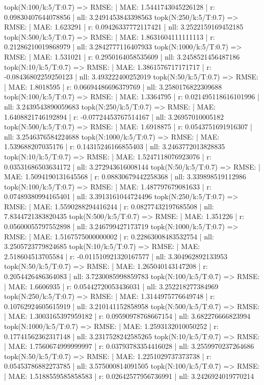 topk(N:100/k:5/T:0.7) => RMSE: | MAE: 1.5441743045226128 | r: 0.09830407644078856 | nll: 3.2491453843398563
topk(N:250/k:5/T:0.7) => RMSE: | MAE: 1.623291 | r: 0.09426337772117421 | nll: 3.2522159169452185
topk(N:500/k:5/T:0.7) => RMSE: | MAE: 1.8631604111111113 | r: 0.21286210019868979 | nll: 3.2842777116407933
topk(N:1000/k:5/T:0.7) => RMSE: | MAE: 1.531021 | r: 0.2950164058535609 | nll: 3.2458521456487186
topk(N:10/k:5/T:0.7) => RMSE: | MAE: 1.3861576717171717 | r: -0.08436802259250123 | nll: 3.493222400252019
topk(N:50/k:5/T:0.7) => RMSE: | MAE: 1.8018595 | r: 0.06694486696379769 | nll: 3.2580176822309688
topk(N:100/k:5/T:0.7) => RMSE: | MAE: 1.3364795 | r: 0.021495118616101996 | nll: 3.2439543890059683
topk(N:250/k:5/T:0.7) => RMSE: | MAE: 1.6408821746192894 | r: -0.07724453767514167 | nll: 3.26957010005182
topk(N:500/k:5/T:0.7) => RMSE: | MAE: 1.6918875 | r: 0.0543751691916307 | nll: 3.2546376584224688
topk(N:1000/k:5/T:0.7) => RMSE: | MAE: 1.539688207035176 | r: 0.14315246166855403 | nll: 3.2463772013828835
topk(N:10/k:5/T:0.7) => RMSE: | MAE: 1.5247118076923076 | r: 0.03531686503634172 | nll: 3.272943616008144
topk(N:50/k:5/T:0.7) => RMSE: | MAE: 1.5094190131645568 | r: 0.08830679442258368 | nll: 3.339898519112986
topk(N:100/k:5/T:0.7) => RMSE: | MAE: 1.487797679081633 | r: 0.07489380994165401 | nll: 3.3913161044724496
topk(N:250/k:5/T:0.7) => RMSE: | MAE: 1.5590288294416244 | r: 0.08277432197685508 | nll: 7.8344721383820435
topk(N:500/k:5/T:0.7) => RMSE: | MAE: 1.351226 | r: 0.05600055797552898 | nll: 3.246799427173719
topk(N:1000/k:5/T:0.7) => RMSE: | MAE: 1.5167575000000002 | r: 0.22863008483532754 | nll: 3.2505723779824685
topk(N:10/k:5/T:0.7) => RMSE: | MAE: 2.518604513705584 | r: -0.011510921320167577 | nll: 3.304962892133953
topk(N:50/k:5/T:0.7) => RMSE: | MAE: 1.265040143147208 | r: 0.2054426486364083 | nll: 3.7230085998859783
topk(N:100/k:5/T:0.7) => RMSE: | MAE: 1.6606935 | r: 0.05442720053436031 | nll: 3.252218277384969
topk(N:250/k:5/T:0.7) => RMSE: | MAE: 1.3144975776649748 | r: 0.10762924605615919 | nll: 3.210141152858958
topk(N:500/k:5/T:0.7) => RMSE: | MAE: 1.3003165397959182 | r: 0.09590978768667154 | nll: 3.682276666823994
topk(N:1000/k:5/T:0.7) => RMSE: | MAE: 1.2593132010050252 | r: 0.17741562362317148 | nll: 3.2317528242585265
topk(N:10/k:5/T:0.7) => RMSE: | MAE: 1.7560674999999997 | r: 0.03793783354416028 | nll: 3.2559970237264686
topk(N:50/k:5/T:0.7) => RMSE: | MAE: 1.2251029737373738 | r: 0.05453786882273785 | nll: 3.575000814091505
topk(N:100/k:5/T:0.7) => RMSE: | MAE: 1.5188559585858583 | r: 0.02642577956736991 | nll: 3.2426924019770214
